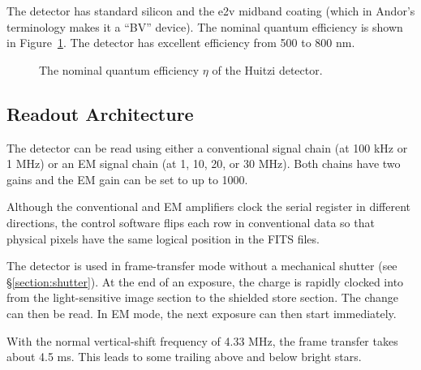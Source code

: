 The detector has standard silicon and the e2v midband coating (which in Andor's terminology makes it a “BV” device). The nominal quantum efficiency is shown in Figure~\ref{figure:detector-quantum-efficiency}. The detector has excellent efficiency from 500 to 800 nm.

\begin{figure}
\begin{center}
\end{center}
\caption{The nominal quantum efficiency $\eta$ of the Huitzi detector.}
\label{figure:detector-quantum-efficiency}
\end{figure}


\subsection{Readout Architecture}

The detector can be read using either a conventional signal chain (at 100 kHz or 1 MHz) or an EM signal chain (at 1, 10, 20, or 30 MHz). Both chains have two gains and the EM gain can be set to up to 1000. 

Although the conventional and EM amplifiers clock the serial register in different directions, the control software flips each row in conventional data so that physical pixels have the same logical position in the FITS files.

The detector is used in frame-transfer mode without a mechanical shutter (see \S\ref{section:shutter}). At the end of an exposure, the charge is rapidly clocked into from the light-sensitive image section to the shielded store section. The change can then be read. In EM mode, the next exposure can then start immediately.

With the normal vertical-shift frequency of 4.33 MHz, the frame transfer takes about 4.5 ms. This leads to some trailing above and below bright stars.

